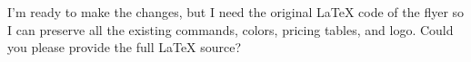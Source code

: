 I’m ready to make the changes, but I need the original LaTeX code of the flyer so I can preserve all the existing commands, colors, pricing tables, and logo. Could you please provide the full LaTeX source?